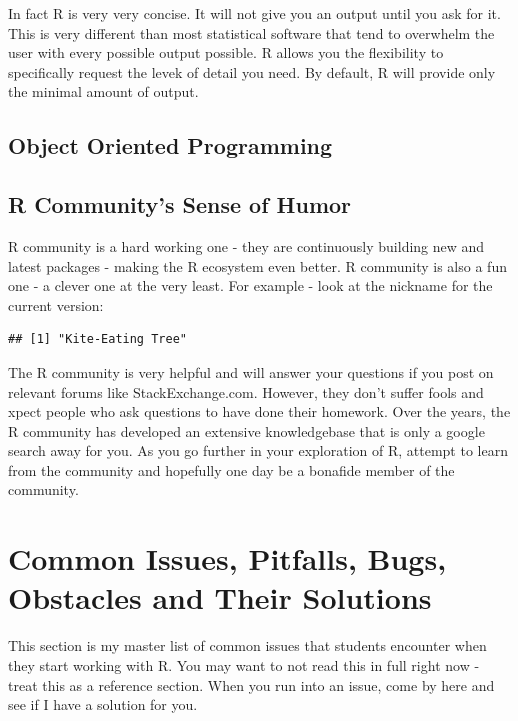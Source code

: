 \documentclass[10pt, letterpaper, twoside]{memoir}\usepackage{knitr}
\begin{document}
In fact R is very very concise. It will not give you an output until you ask for it. This is very different than most statistical software that tend to overwhelm the user with every possible output possible. R allows you the flexibility to specifically request the levek of detail you need. By default, R will provide only the minimal amount of output.

\subsection{Object Oriented Programming}

\subsection{R Community's Sense of Humor}

R community is a hard working one - they are continuously building new and latest packages - making the R ecosystem even better. R community is also a fun one - a clever one at the very least. For example - look at the nickname for the current version:
\begin{knitrout}
\color{fgcolor}\begin{kframe}
\begin{alltt}
\hlopt{$}
\end{alltt}
\begin{verbatim}
## [1] "Kite-Eating Tree"
\end{verbatim}
\end{kframe}
\end{knitrout}

The R community is very helpful and will answer your questions if you post on relevant forums like StackExchange.com. However, they don't suffer fools and xpect people who ask questions to have done their homework. Over the years, the R community has developed an extensive knowledgebase that is only a google search away for you. As you go further in your exploration of R, attempt to learn from the community and hopefully one day be a bonafide member of the community.

\section{Common Issues, Pitfalls, Bugs, Obstacles and Their Solutions}

This section is my master list of common issues that students encounter when they start working with R. You may want to not read this in full right now - treat this as a reference section. When you run into an issue, come by here and see if I have a solution for you.
\end{document}
